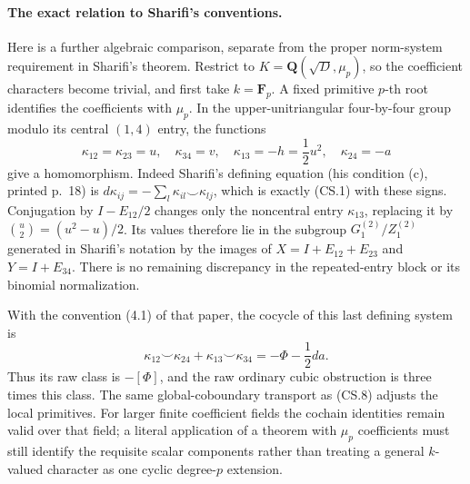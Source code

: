 \paragraph{The exact relation to Sharifi's conventions.}
Here is a further algebraic comparison, separate from the
proper norm-system requirement in Sharifi's theorem.
Restrict to \(K=\mathbf Q(\sqrt D,\mu_p)\), so the
coefficient characters become trivial, and first take
\(k=\mathbf F_p\).  A fixed primitive \(p\)-th root
identifies the coefficients with \(\mu_p\).
In the upper-unitriangular four-by-four group modulo its
central \((1,4)\) entry, the functions
\[
 \kappa_{12}=\kappa_{23}=u,\quad\kappa_{34}=v,\quad
 \kappa_{13}=-h=\frac12u^2,\quad\kappa_{24}=-a
                                                               \tag{CS.9}
\]
give a homomorphism.  Indeed Sharifi's defining equation
(his condition (c), printed p.~18) is
\(d\kappa_{ij}=-\sum_l\kappa_{il}\smile\kappa_{lj}\),
which is exactly (CS.1) with these signs.
Conjugation by \(I-E_{12}/2\) changes only the noncentral
entry \(\kappa_{13}\), replacing it by
\(\binom{u}{2}=(u^2-u)/2\).  Its values therefore lie
in the subgroup \(G_1^{(2)}/Z_1^{(2)}\) generated in
Sharifi's notation by the images of
\(X=I+E_{12}+E_{23}\) and \(Y=I+E_{34}\).
There is no remaining discrepancy in the repeated-entry
block or its binomial normalization.

With the convention (4.1) of that paper, the cocycle
of this last defining system is
\[
 \kappa_{12}\smile\kappa_{24}
       +\kappa_{13}\smile\kappa_{34}
       =-\Phi-\frac12d a .                              \tag{CS.10}
\]
Thus its raw class is \(-[\Phi]\), and the raw ordinary
cubic obstruction is three times this class.  The same
global-coboundary transport as (CS.8) adjusts the local
primitives.  For larger finite coefficient fields the
cochain identities remain valid over that field; a
literal application of a theorem with \(\mu_p\)
coefficients must still identify the requisite scalar
components rather than treating a general \(k\)-valued
character as one cyclic degree-\(p\) extension.

